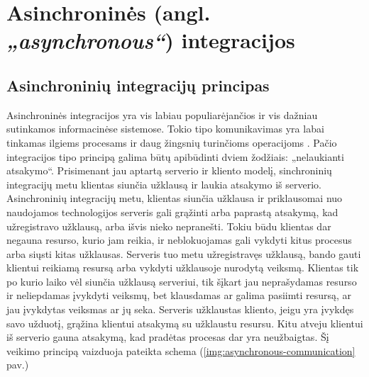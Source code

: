 \section{Asinchroninės (angl. \textit{„asynchronous“}) integracijos}

\subsection{Asinchroninių integracijų principas}
Asinchroninės integracijos yra vis labiau populiarėjančios ir vis dažniau sutinkamos informacinėse sistemose.
Tokio tipo komunikavimas yra labai tinkamas ilgiems procesams ir daug žingsnių turinčioms operacijoms \cite{Bk2}.
Pačio integracijos tipo principą galima būtų apibūdinti dviem žodžiais: „nelaukianti atsakymo“. Prisimenant jau
aptartą serverio ir kliento modelį, sinchroninių integracijų metu klientas siunčia užklausą ir laukia atsakymo iš serverio.
Asinchroninių integracijų metu, klientas siunčia užklausa ir priklausomai nuo naudojamos technologijos serveris gali grąžinti
arba paprastą atsakymą, kad užregistravo užklausą, arba išvis nieko nepranešti. Tokiu būdu klientas dar negauna resurso, kurio jam reikia,
ir neblokuojamas gali vykdyti kitus procesus arba siųsti kitas užklausas. Serveris tuo metu užregistravęs užklausą, bando gauti klientui reikiamą
resursą arba vykdyti užklausoje nurodytą veiksmą. Klientas tik po kurio laiko vėl siunčia užklausą serveriui, tik šįkart jau neprašydamas resurso
ir neliepdamas įvykdyti veiksmų, bet klausdamas ar galima pasiimti resursą, ar jau įvykdytas veiksmas ar jų seka.
Serveris užklaustas kliento, jeigu yra įvykdęs savo užduotį, grąžina klientui atsakymą su užklaustu resursu. Kitu atveju klientui iš serverio
gauna atsakymą, kad pradėtas procesas dar yra neužbaigtas. Šį veikimo principą vaizduoja pateikta schema (\ref{img:asynchronous-communication} pav.)


